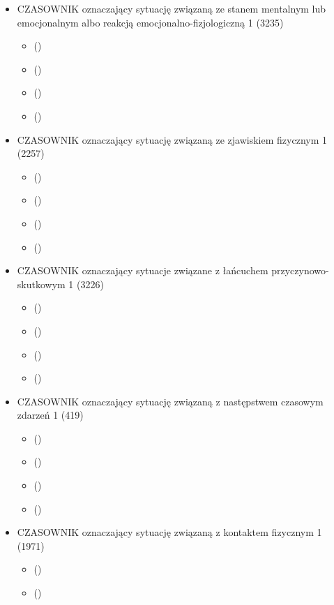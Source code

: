 \documentclass[a4paper,12pt]{article}
\begin{document}
\begin{itemize}
\begin{itemize}
\begin{itemize}
      \begin{itemize}
      \item   ()
      \item   ()
      \item   ()
      \item   ()
      \end{itemize}
    \item CZASOWNIK oznaczający sytuację związaną ze stanem mentalnym lub emocjonalnym albo reakcją emocjonalno-fizjologiczną 1  (3235)
      \begin{itemize}
      \item   ()
      \item   ()
      \item   ()
      \item   ()
      \end{itemize}
    \item CZASOWNIK oznaczający sytuację związaną ze zjawiskiem fizycznym 1  (2257)
      \begin{itemize}
      \item   ()
      \item   ()
      \item   ()
      \item   ()
      \end{itemize}
    \item CZASOWNIK oznaczający sytuacje związane z łańcuchem przyczynowo-skutkowym 1  (3226)
      \begin{itemize}
      \item   ()
      \item   ()
      \item   ()
      \item   ()
      \end{itemize}
    \item CZASOWNIK oznaczający sytuację związaną z następstwem czasowym zdarzeń 1  (419)
      \begin{itemize}
      \item   ()
      \item   ()
      \item   ()
      \item   ()
      \end{itemize}
    \item CZASOWNIK oznaczający sytuację związaną z kontaktem fizycznym 1  (1971)
      \begin{itemize}
      \item   ()
      \item   ()

\end{itemize}
\end{itemize}
\end{itemize}
\end{itemize}
\end{document}
